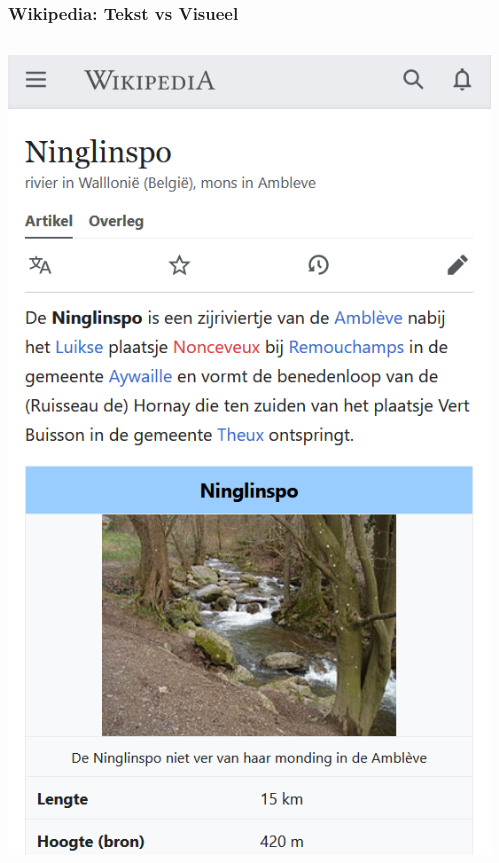 \documentclass[presentatie.tex]{subfiles}
\begin{document}
    \begin{frame}
        \frametitle{Wikipedia: Tekst vs Visueel}
        \begin{columns}
            \begin{column}{0.4\textwidth}
                \includegraphics[width=\linewidth,height=0.85\textheight,keepaspectratio]{assets/wikipediaVisual}
            \end{column}
            \begin{column}{0.6\textwidth}
                

\end{column}
\end{columns}
\end{frame}
\end{document}
